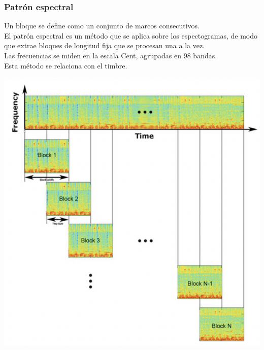 \documentclass[
10pt, %
aspectratio=169, %
]{beamer}
\begin{document}
	\begin{frame}
		
		\frametitle{Patrón espectral}
		
		\begin{minipage}{.5\textwidth}
			
			Un bloque se define como un conjunto de marcos consecutivos. \\[1.5mm]
			
			El patrón espectral es un método que se aplica sobre los espectogramas, de modo que extrae bloques de longitud fija que se procesan una a la vez. \\[1.5mm]
			
			Las frecuencias se miden en la escala Cent, agrupadas en 98 bandas. \\[1.5mm]
			
			
			Esta método se relaciona con el timbre. 
			
		\end{minipage}%
		\begin{minipage}{.58\textwidth}
			
			\centering
			\includegraphics[scale=0.3]{bloque.png}
			
		\end{minipage}%
		
	\end{frame}
	
\end{document}
